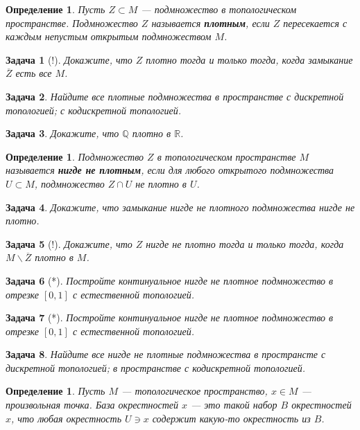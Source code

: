 \documentclass[12pt]{book}
\def\R{{\mathbb R}}
\def\Q{{\mathbb Q}}
\theoremstyle{upshape}
\newtheorem{zadacha}{Задача}[chapter]
\theoremstyle{generic}
\newtheorem{opredelenie}[teorema]{Определение}
\newtheorem{remark}[teorema]{Замечание}
\def\замечание{\begin{remark}}
\def\еза{\end{remark}}
\theoremstyle{upshapenonumber}
\newcommand{\следствие}{%
     \refstepcounter{teorema}
     {\noindent\bf Следствие \thechapter.\arabic{teorema}:\ }}
\newcommand{\пример}{%
     \refstepcounter{teorema}
     {\noindent\bf Пример \thechapter.\arabic{teorema}:\ }}
\newcommand{\лемма}{%
     \refstepcounter{teorema}
     {\noindent\bf Лемма \thechapter.\arabic{teorema}:\ }}
\newcommand{\теорема}{%
     \refstepcounter{teorema}
     {\noindent\bf Теорема \thechapter.\arabic{teorema}:\ }}
\newcommand{\утверждение}{%
     \refstepcounter{teorema}
     {\noindent\bf Утверждение \thechapter.\arabic{teorema}:\ }}
\def\ем{\em}
\def\задача{\begin{zadacha}}
\def\ез{\end{zadacha}}
\def\еу{\end{ukazanie}}
\def\определение{\begin{opredelenie}}
\def\ео{\end{opredelenie}}
\def\енум{\begin{enumerate}}
\def\ее{\end{enumerate}}
\begin{document}
{\begin{opredelenie}
Пусть $Z\subset M$ --- подмножество в топологическом пространстве.
Подмножество $Z$ называется {\bf плотным}, если $Z$ пересекается с
каждым непустым открытым подмножеством $M$.
\end{opredelenie}

\begin{zadacha}[!]
Докажите, что $Z$ плотно тогда и только тогда, когда замыкание
$\overline{Z}$ есть все $M$.
\end{zadacha}

\begin{zadacha}
Найдите все плотные подмножества в пространстве с дискретной
топологией; с кодискретной топологией.
\end{zadacha}

\begin{zadacha}
Докажите, что $\Q$ плотно в $\R$.
\end{zadacha}


\определение
Подмножество $Z$ в топологическом пространстве $M$ называется {\bf
нигде не плотным}, если для любого открытого подмножества $U\subset
M$, подмножество $Z\cap U$ не плотно в $U$. 
\ео

\задача
Докажите, что замыкание нигде не плотного подмножества
нигде не плотно.
\ез

\begin{zadacha}[!]
Докажите, что $Z$ нигде
не плотно тогда и только тогда, когда $M\backslash \overline{Z}$
плотно в $M$.
\end{zadacha}

\begin{zadacha}[*] 
Постройте континуальное нигде не плотное подмножество в отрезке
$[0, 1]$ с естественной топологией.
\end{zadacha}

\begin{zadacha}[*] 
Постройте континуальное нигде не плотное подмножество в отрезке
$[0, 1]$ с естественной топологией.
\end{zadacha}

\begin{zadacha}
Найдите все нигде не плотные подмножества в пространсте с дискретной
топологией; в пространстве с кодискретной топологией.
\end{zadacha}

\begin{opredelenie}
Пусть $M$ --- топологическое пространство, $x\in M$ --- произвольная
точка. База окрестностей $x$ --- это такой набор $B$ окрестностей
$x$, что любая окрестность $U\ni x$ содержит какую-то окрестность из
$B$.
\end{opredelenie}

}
\end{document}
